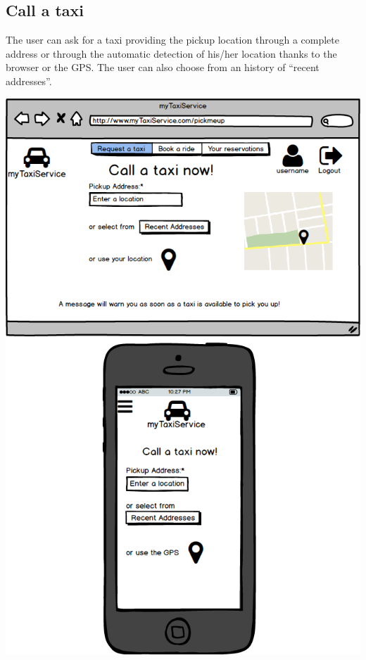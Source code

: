 \documentclass[a4paper,11pt]{report} %
\begin{document}
	\subsection{Call a taxi} The user can ask for a taxi providing the pickup location through a complete address or through the automatic detection of his/her location thanks to the browser or the GPS. The user can also choose from an history of ``recent addresses''.
	\begin{center}
		\includegraphics[width=0.9\linewidth]{Pictures/CallATaxi}
	\end{center}
	\pagebreak
	
\end{document}
